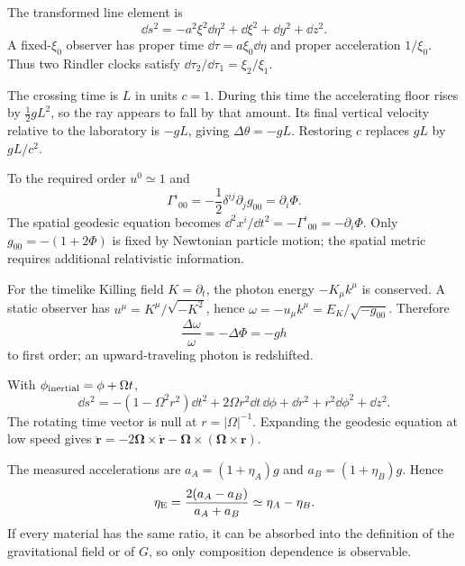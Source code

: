 \begin{solutions}

\begin{solution}
The transformed line element is
\[
\dd s^2=-a^2\xi^2\dd\eta^2+\dd\xi^2+\dd y^2+\dd z^2.
\]
A fixed-\(\xi_0\) observer has proper time
\(\dd\tau=a\xi_0\dd\eta\) and proper acceleration \(1/\xi_0\).
Thus two Rindler clocks satisfy
\(\dd\tau_2/\dd\tau_1=\xi_2/\xi_1\).
\end{solution}

\begin{solution}
The crossing time is \(L\) in units \(c=1\).  During this time the accelerating
floor rises by \(\tfrac12gL^2\), so the ray appears to fall by that amount.
Its final vertical velocity relative to the laboratory is \(-gL\), giving
\(\Delta\theta=-gL\).  Restoring \(c\) replaces \(gL\) by \(gL/c^2\).
\end{solution}

\begin{solution}
To the required order \(u^0\simeq1\) and
\[
\Gamma^i{}_{00}
=-\frac12\delta^{ij}\partial_jg_{00}
=\partial_i\Phi.
\]
The spatial geodesic equation becomes
\(\dd^2x^i/\dd t^2=-\Gamma^i{}_{00}=-\partial_i\Phi\).
Only \(g_{00}=-(1+2\Phi)\) is fixed by Newtonian particle motion; the spatial
metric requires additional relativistic information.
\end{solution}

\begin{solution}
For the timelike Killing field \(K=\partial_t\), the photon energy
\(-K_\mu k^\mu\) is conserved.  A static observer has
\(u^\mu=K^\mu/\sqrt{-K^2}\), hence
\(\omega=-u_\mu k^\mu=E_K/\sqrt{-g_{00}}\).  Therefore
\[
\frac{\Delta\omega}{\omega}=-\Delta\Phi=-gh
\]
to first order; an upward-traveling photon is redshifted.
\end{solution}

\begin{solution}
With \(\phi_{\rm inertial}=\phi+\Omega t\),
\[
\dd s^2=-(1-\Omega^2r^2)\dd t^2
+2\Omega r^2\dd t\,\dd\phi+\dd r^2+r^2\dd\phi^2+\dd z^2.
\]
The rotating time vector is null at \(r=|\Omega|^{-1}\).  Expanding the
geodesic equation at low speed gives
\(\ddot{\bm r}=-2\bm\Omega\times\dot{\bm r}
-\bm\Omega\times(\bm\Omega\times\bm r)\).
\end{solution}

\begin{solution}
The measured accelerations are
\(a_A=(1+\eta_A)g\) and \(a_B=(1+\eta_B)g\).  Hence
\[
\eta_{\rm E}=\frac{2(a_A-a_B)}{a_A+a_B}
\simeq\eta_A-\eta_B.
\]
If every material has the same ratio, it can be absorbed into the definition
of the gravitational field or of \(G\), so only composition dependence is
observable.
\end{solution}


\end{solutions}

